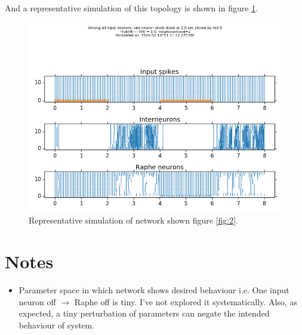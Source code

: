 \documentclass[]{article}
\begin{document}
And a representative simulation of this topology is shown in figure
\ref{fig:simulation2}.

\begin{figure}[ht!]
\begin{center}
    \includegraphics[width=1\textwidth]{./_snapshots/minimal_network.png}
\end{center}
\caption{Representative simulation of network shown figure \ref{fig:2}.}
\label{fig:simulation2}
\end{figure}

\section{Notes}
\label{sec:notes}

\begin{itemize}
    \item Parameter space in which network shows desired behaviour i.e. One
        input neuron off $\rightarrow$ Raphe off is tiny. I've not explored it
        systematically. Also, as expected, a tiny perturbation of parameters can
        negate the intended behaviour of system.
\end{itemize}
\end{document}
